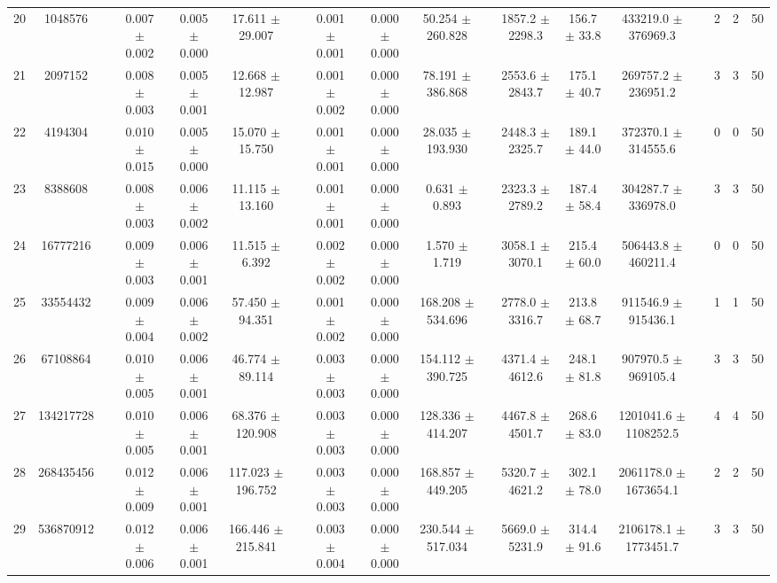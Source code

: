 \documentclass[11pt]{article}
\begin{document}
\begin{landscape}
\begin{table}
\begin{tabular}{cccccccccccccccccc}
20 & 1048576 &&  0.007 $\pm$ 0.002 & 0.005 $\pm$ 0.000 & 17.611 $\pm$ 29.007 &&  0.001 $\pm$ 0.001 & 0.000 $\pm$ 0.000 & 50.254 $\pm$ 260.828 &&  1857.2 $\pm$ 2298.3 & 156.7 $\pm$ 33.8 & 433219.0 $\pm$ 376969.3 && 2& 2& 50\\
21 & 2097152 &&  0.008 $\pm$ 0.003 & 0.005 $\pm$ 0.001 & 12.668 $\pm$ 12.987 &&  0.001 $\pm$ 0.002 & 0.000 $\pm$ 0.000 & 78.191 $\pm$ 386.868 &&  2553.6 $\pm$ 2843.7 & 175.1 $\pm$ 40.7 & 269757.2 $\pm$ 236951.2 && 3& 3& 50\\
22 & 4194304 &&  0.010 $\pm$ 0.015 & 0.005 $\pm$ 0.000 & 15.070 $\pm$ 15.750 &&  0.001 $\pm$ 0.001 & 0.000 $\pm$ 0.000 & 28.035 $\pm$ 193.930 &&  2448.3 $\pm$ 2325.7 & 189.1 $\pm$ 44.0 & 372370.1 $\pm$ 314555.6 && 0& 0& 50\\
23 & 8388608 &&  0.008 $\pm$ 0.003 & 0.006 $\pm$ 0.002 & 11.115 $\pm$ 13.160 &&  0.001 $\pm$ 0.001 & 0.000 $\pm$ 0.000 & 0.631 $\pm$ 0.893 &&  2323.3 $\pm$ 2789.2 & 187.4 $\pm$ 58.4 & 304287.7 $\pm$ 336978.0 && 3& 3& 50\\
24 & 16777216 &&  0.009 $\pm$ 0.003 & 0.006 $\pm$ 0.001 & 11.515 $\pm$ 6.392 &&  0.002 $\pm$ 0.002 & 0.000 $\pm$ 0.000 & 1.570 $\pm$ 1.719 &&  3058.1 $\pm$ 3070.1 & 215.4 $\pm$ 60.0 & 506443.8 $\pm$ 460211.4 && 0& 0& 50\\
25 & 33554432 &&  0.009 $\pm$ 0.004 & 0.006 $\pm$ 0.002 & 57.450 $\pm$ 94.351 &&  0.001 $\pm$ 0.002 & 0.000 $\pm$ 0.000 & 168.208 $\pm$ 534.696 &&  2778.0 $\pm$ 3316.7 & 213.8 $\pm$ 68.7 & 911546.9 $\pm$ 915436.1 && 1& 1& 50\\
26 & 67108864 &&  0.010 $\pm$ 0.005 & 0.006 $\pm$ 0.001 & 46.774 $\pm$ 89.114 &&  0.003 $\pm$ 0.003 & 0.000 $\pm$ 0.000 & 154.112 $\pm$ 390.725 &&  4371.4 $\pm$ 4612.6 & 248.1 $\pm$ 81.8 & 907970.5 $\pm$ 969105.4 && 3& 3& 50\\
27 & 134217728 &&  0.010 $\pm$ 0.005 & 0.006 $\pm$ 0.001 & 68.376 $\pm$ 120.908 &&  0.003 $\pm$ 0.003 & 0.000 $\pm$ 0.000 & 128.336 $\pm$ 414.207 &&  4467.8 $\pm$ 4501.7 & 268.6 $\pm$ 83.0 & 1201041.6 $\pm$ 1108252.5 && 4& 4& 50\\
28 & 268435456 &&  0.012 $\pm$ 0.009 & 0.006 $\pm$ 0.001 & 117.023 $\pm$ 196.752 &&  0.003 $\pm$ 0.003 & 0.000 $\pm$ 0.000 & 168.857 $\pm$ 449.205 &&  5320.7 $\pm$ 4621.2 & 302.1 $\pm$ 78.0 & 2061178.0 $\pm$ 1673654.1 && 2& 2& 50\\
29 & 536870912 &&  0.012 $\pm$ 0.006 & 0.006 $\pm$ 0.001 & 166.446 $\pm$ 215.841 &&  0.003 $\pm$ 0.004 & 0.000 $\pm$ 0.000 & 230.544 $\pm$ 517.034 &&  5669.0 $\pm$ 5231.9 & 314.4 $\pm$ 91.6 & 2106178.1 $\pm$ 1773451.7 && 3& 3& 50\\

\end{tabular}
\end{table}
\end{landscape}
\end{document}
